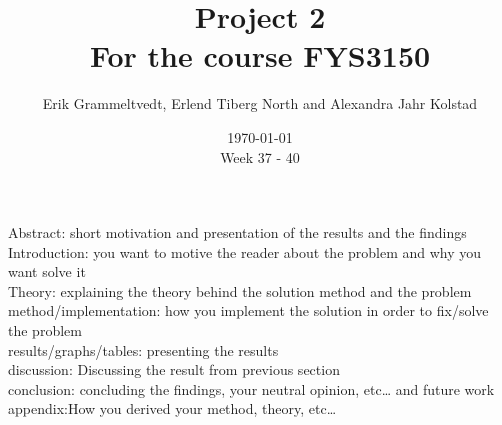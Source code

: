 \documentclass{article}
\begin{document}
\addtocounter{page}{0}

\title{Project 2 \\
      \large For the course FYS3150}
\date{\today \\
    \vspace{1mm}
    \large Week 37 - 40}

\author{Erik Grammeltvedt, Erlend Tiberg North and Alexandra Jahr Kolstad}

\maketitle


\vspace{1cm}

\tableofcontents

\vspace{1cm}


\newpage
\clearpage


Abstract: short motivation and presentation of the results and the findings \\

Introduction: you want to motive the reader about the problem and why you want solve it \\

Theory: explaining the theory behind the solution method and the problem \\

method/implementation: how you implement the solution in order to fix/solve the problem \\

results/graphs/tables: presenting the results \\

discussion: Discussing the result from previous section \\

conclusion: concluding the findings, your neutral opinion, etc… and future work \\

appendix:How you derived your method, theory, etc… \\
\end{document}
